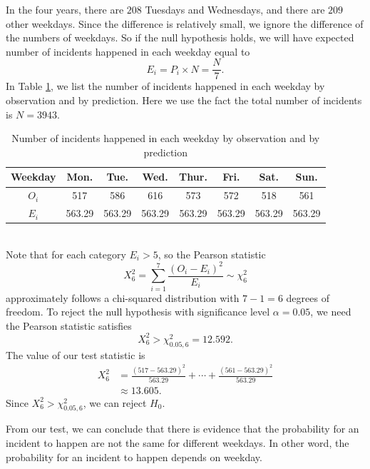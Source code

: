 \documentclass[11pt,a4paper,english]{article}
\begin{document}
In the four years, there are $208$ Tuesdays and Wednesdays, and there are $209$ other weekdays. 
Since the difference is relatively small, we ignore the difference of the numbers of weekdays.
So if the null hypothesis holds, we will have expected number of incidents happened in each weekday equal to
\begin{equation*}
	E_{i} = P_{i} \times N = \frac{N}{7}.
\end{equation*}
In Table \ref{tab:weekdays}, we list the number of incidents happened in each weekday by observation and by prediction. 
Here we use the fact the total number of incidents is $N = 3943$.
\begin{table}[htbp]
	\centering
	\begin{tabular}{c|ccccccc}
		\hline
		Weekday & Mon. & Tue. & Wed. & Thur. & Fri. & Sat. & Sun.\\
		\hline
		$O_{i}$ & 517 & 586 & 616 & 573 & 572 & 518 & 561\\ \hline
		$E_{i}$ & 563.29 & 563.29 & 563.29 & 563.29 & 563.29 & 563.29 & 563.29\\
		\hline
	\end{tabular}
	\caption{Number of incidents happened in each weekday by observation and by prediction}
	\label{tab:weekdays}
\end{table}
\\Note that for each category $E_{i} > 5$, so the Pearson statistic
\begin{equation*}
	X^{2}_{6} = \sum_{i = 1}^{7}\frac{(O_{i} - E_{i})^{2}}{E_{i}}
	\sim \chi^{2}_{6}
\end{equation*}
approximately follows a chi-squared distribution with $7-1 = 6$ degrees of freedom. 
To reject the null hypothesis with significance level $\alpha = 0.05$, we need the Pearson statistic satisfies
\begin{equation*}
	X^{2}_{6} > \chi^{2}_{0.05,6} = 12.592.
\end{equation*}
The value of our test statistic is
\begin{align*}
	X^{2}_{6} &= \frac{(517-563.29)^{2}}{563.29}+\cdots+\frac{(561-563.29)^{2}}{563.29}\\
	&\approx 13.605.
\end{align*}
Since $X^{2}_{6} > \chi^{2}_{0.05,6}$, we can reject $H_{0}$.

From our test, we can conclude that there is evidence that the probability for an incident to happen are not the same for different weekdays. In other word, the probability for an incident to happen depends on weekday.
\end{document}
